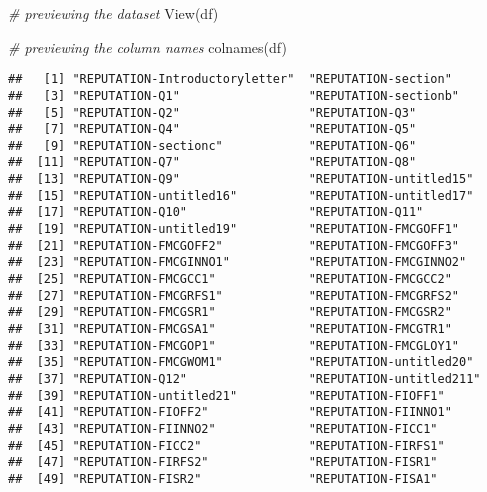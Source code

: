 \documentclass[
]{article}
\newenvironment{Shaded}{\begin{snugshade}}{\end{snugshade}}
\newcommand{\CommentTok}[1]{\textcolor[rgb]{0.56,0.35,0.01}{\textit{#1}}}
\newcommand{\FunctionTok}[1]{\textcolor[rgb]{0.00,0.00,0.00}{#1}}
\newcommand{\NormalTok}[1]{#1}
\begin{document}
\begin{Shaded}
\begin{Highlighting}[]
\CommentTok{\# previewing the dataset}
\FunctionTok{View}\NormalTok{(df)}
\end{Highlighting}
\end{Shaded}

\begin{Shaded}
\begin{Highlighting}[]
\CommentTok{\# previewing the column names}
\FunctionTok{colnames}\NormalTok{(df)}
\end{Highlighting}
\end{Shaded}

\begin{verbatim}
##   [1] "REPUTATION-Introductoryletter"  "REPUTATION-section"            
##   [3] "REPUTATION-Q1"                  "REPUTATION-sectionb"           
##   [5] "REPUTATION-Q2"                  "REPUTATION-Q3"                 
##   [7] "REPUTATION-Q4"                  "REPUTATION-Q5"                 
##   [9] "REPUTATION-sectionc"            "REPUTATION-Q6"                 
##  [11] "REPUTATION-Q7"                  "REPUTATION-Q8"                 
##  [13] "REPUTATION-Q9"                  "REPUTATION-untitled15"         
##  [15] "REPUTATION-untitled16"          "REPUTATION-untitled17"         
##  [17] "REPUTATION-Q10"                 "REPUTATION-Q11"                
##  [19] "REPUTATION-untitled19"          "REPUTATION-FMCGOFF1"           
##  [21] "REPUTATION-FMCGOFF2"            "REPUTATION-FMCGOFF3"           
##  [23] "REPUTATION-FMCGINNO1"           "REPUTATION-FMCGINNO2"          
##  [25] "REPUTATION-FMCGCC1"             "REPUTATION-FMCGCC2"            
##  [27] "REPUTATION-FMCGRFS1"            "REPUTATION-FMCGRFS2"           
##  [29] "REPUTATION-FMCGSR1"             "REPUTATION-FMCGSR2"            
##  [31] "REPUTATION-FMCGSA1"             "REPUTATION-FMCGTR1"            
##  [33] "REPUTATION-FMCGOP1"             "REPUTATION-FMCGLOY1"           
##  [35] "REPUTATION-FMCGWOM1"            "REPUTATION-untitled20"         
##  [37] "REPUTATION-Q12"                 "REPUTATION-untitled211"        
##  [39] "REPUTATION-untitled21"          "REPUTATION-FIOFF1"             
##  [41] "REPUTATION-FIOFF2"              "REPUTATION-FIINNO1"            
##  [43] "REPUTATION-FIINNO2"             "REPUTATION-FICC1"              
##  [45] "REPUTATION-FICC2"               "REPUTATION-FIRFS1"             
##  [47] "REPUTATION-FIRFS2"              "REPUTATION-FISR1"              
##  [49] "REPUTATION-FISR2"               "REPUTATION-FISA1"              

\end{verbatim}
\end{document}
